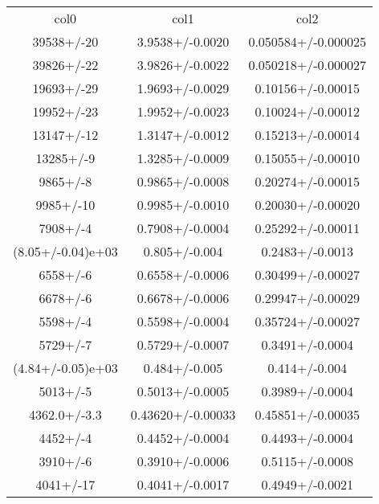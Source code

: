 \begin{table}
\begin{tabular}{ccc}
col0 & col1 & col2 \\
39538+/-20 & 3.9538+/-0.0020 & 0.050584+/-0.000025 \\
39826+/-22 & 3.9826+/-0.0022 & 0.050218+/-0.000027 \\
19693+/-29 & 1.9693+/-0.0029 & 0.10156+/-0.00015 \\
19952+/-23 & 1.9952+/-0.0023 & 0.10024+/-0.00012 \\
13147+/-12 & 1.3147+/-0.0012 & 0.15213+/-0.00014 \\
13285+/-9 & 1.3285+/-0.0009 & 0.15055+/-0.00010 \\
9865+/-8 & 0.9865+/-0.0008 & 0.20274+/-0.00015 \\
9985+/-10 & 0.9985+/-0.0010 & 0.20030+/-0.00020 \\
7908+/-4 & 0.7908+/-0.0004 & 0.25292+/-0.00011 \\
(8.05+/-0.04)e+03 & 0.805+/-0.004 & 0.2483+/-0.0013 \\
6558+/-6 & 0.6558+/-0.0006 & 0.30499+/-0.00027 \\
6678+/-6 & 0.6678+/-0.0006 & 0.29947+/-0.00029 \\
5598+/-4 & 0.5598+/-0.0004 & 0.35724+/-0.00027 \\
5729+/-7 & 0.5729+/-0.0007 & 0.3491+/-0.0004 \\
(4.84+/-0.05)e+03 & 0.484+/-0.005 & 0.414+/-0.004 \\
5013+/-5 & 0.5013+/-0.0005 & 0.3989+/-0.0004 \\
4362.0+/-3.3 & 0.43620+/-0.00033 & 0.45851+/-0.00035 \\
4452+/-4 & 0.4452+/-0.0004 & 0.4493+/-0.0004 \\
3910+/-6 & 0.3910+/-0.0006 & 0.5115+/-0.0008 \\
4041+/-17 & 0.4041+/-0.0017 & 0.4949+/-0.0021 \\
\end{tabular}
\end{table}
